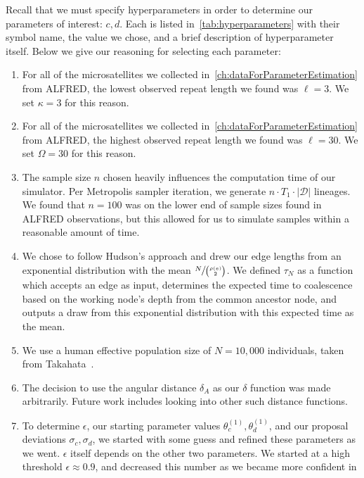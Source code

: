 Recall that we must specify hyperparameters in order to determine our parameters of interest: $c, d$.
Each is listed in~\autoref{tab:hyperparameters} with their symbol name, the value we chose, and a brief description of 
hyperparameter itself.
Below we give our reasoning for selecting each parameter:
\begin{enumerate}
    \item For all of the microsatellites we collected in~\autoref{ch:dataForParameterEstimation} from ALFRED, the
        lowest observed repeat length we found was $\ell=3$.
        We set $\kappa = 3$ for this reason.
    \item For all of the microsatellites we collected in~\autoref{ch:dataForParameterEstimation} from ALFRED, the
        highest observed repeat length we found was $\ell=30$.
        We set $\Omega = 30$ for this reason.
    \item The sample size $n$ chosen heavily influences the computation time of our simulator.
        Per Metropolis sampler iteration, we generate $n \cdot T_1 \cdot | \mathcal{D} |$ lineages.
        We found that $n=100$ was on the lower end of sample sizes found in ALFRED observations, but this allowed for us
        to simulate samples within a reasonable amount of time.
    \item We chose to follow Hudson's approach and drew our edge lengths from an exponential distribution with the mean
        $\sfrac{N}{\binom{\rho(e)}{2}}$.
        We defined $\tau_N$ as a function which accepts an edge as input, determines the expected time to coalescence
        based on the working node's depth from the common ancestor node, and outputs a draw from this exponential
        distribution with this expected time as the mean.
    \item We use a human effective population size of $N=10,000$ individuals, taken from
        Takahata~\cite{takahataAllelicGenealogyHuman1993}.
    \item The decision to use the angular distance $\delta_A$ as our $\delta$ function was made arbitrarily.
        Future work includes looking into other such distance functions.
    \item To determine $\epsilon$, our starting parameter values $\theta^{(1)}_c, \theta^{(1)}_d$, and our proposal
        deviations $\sigma_c, \sigma_d$, we started with some guess and refined these parameters as we went.
        $\epsilon$ itself depends on the other two parameters.
        We started at a high threshold $\epsilon \approx 0.9$, and decreased this number as we became more confident in

\end{enumerate}
